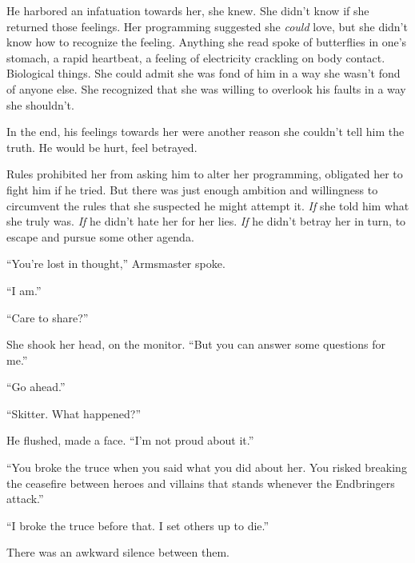 He harbored an infatuation towards her, she knew.  She didn't know if she returned those feelings.  Her programming suggested she \emph{could} love, but she didn't know how to recognize the feeling.  Anything she read spoke of butterflies in one's stomach, a rapid heartbeat, a feeling of electricity crackling on body contact.  Biological things.  She could admit she was fond of him in a way she wasn't fond of anyone else.  She recognized that she was willing to overlook his faults in a way she shouldn't.



In the end, his feelings towards her were another reason she couldn't tell him the truth.  He would be hurt, feel betrayed.



Rules prohibited her from asking him to alter her programming, obligated her to fight him if he tried.  But there was just enough ambition and willingness to circumvent the rules that she suspected he might attempt it.  \emph{If} she told him what she truly was.  \emph{If} he didn't hate her for her lies.  \emph{If} he didn't betray her in turn, to escape and pursue some other agenda.



``You're lost in thought,'' Armsmaster spoke.



``I am.''



``Care to share?''



She shook her head, on the monitor.  ``But you can answer some questions for me.''



``Go ahead.''



``Skitter.  What happened?''



He flushed, made a face.  ``I'm not proud about it.''



``You broke the truce when you said what you did about her.  You risked breaking the ceasefire between heroes and villains that stands whenever the Endbringers attack.''



``I broke the truce before that.  I set others up to die.''



There was an awkward silence between them.



